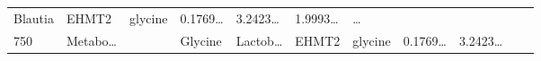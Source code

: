 \documentclass[
]{article}
\begin{document}
\begin{longtable}[]{@{}lllllllllll@{}}
\begin{minipage}[t]{0.07\columnwidth}
Blautia\strut
\end{minipage} & \begin{minipage}[t]{0.07\columnwidth}\raggedright
EHMT2\strut
\end{minipage} & \begin{minipage}[t]{0.09\columnwidth}\raggedright
glycine\strut
\end{minipage} & \begin{minipage}[t]{0.07\columnwidth}\raggedright
0.1769\ldots{}\strut
\end{minipage} & \begin{minipage}[t]{0.07\columnwidth}\raggedright
3.2423\ldots{}\strut
\end{minipage} & \begin{minipage}[t]{0.07\columnwidth}\raggedright
1.9993\ldots{}\strut
\end{minipage} & \begin{minipage}[t]{0.03\columnwidth}\raggedright
\ldots{}\strut
\end{minipage}\tabularnewline
\begin{minipage}[t]{0.03\columnwidth}\raggedright
750\strut
\end{minipage} & \begin{minipage}[t]{0.07\columnwidth}\raggedright
Metabo\ldots{}\strut
\end{minipage} & \begin{minipage}[t]{0.07\columnwidth}\raggedright
\strut
\end{minipage} & \begin{minipage}[t]{0.09\columnwidth}\raggedright
Glycine\strut
\end{minipage} & \begin{minipage}[t]{0.07\columnwidth}\raggedright
Lactob\ldots{}\strut
\end{minipage} & \begin{minipage}[t]{0.07\columnwidth}\raggedright
EHMT2\strut
\end{minipage} & \begin{minipage}[t]{0.09\columnwidth}\raggedright
glycine\strut
\end{minipage} & \begin{minipage}[t]{0.07\columnwidth}\raggedright
0.1769\ldots{}\strut
\end{minipage} & \begin{minipage}[t]{0.07\columnwidth}\raggedright
3.2423\ldots{}\strut
\end{minipage} & \begin{minipage}[t]{0.07\columnwidth}\raggedright

\end{minipage}
\end{longtable}
\end{document}
